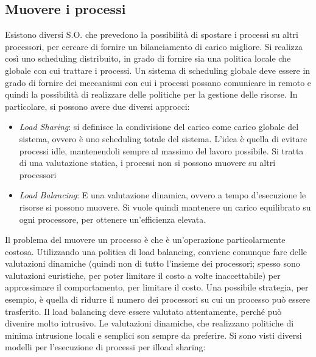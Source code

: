 \subsection{Muovere i processi}
Esistono diversi S.O. che prevedono la possibilità di spostare i processi su altri processori, per cercare di fornire un
bilanciamento di carico migliore. Si realizza così uno scheduling distribuito, in grado di fornire sia una politica
locale che globale con cui trattare i processi. Un sistema di scheduling globale deve essere in grado di fornire dei
meccanismi con cui i processi possano comunicare in remoto e quindi la possibilità di realizzare delle politiche per la
gestione delle risorse.
In particolare, si possono avere due diversi approcci:
\begin{itemize}
 \item \textit{Load Sharing}: si definisce la condivisione del carico come carico globale del sistema, ovvero è uno
 scheduling totale del sistema. L'idea è quella di evitare processi idle, mantenendoli sempre al massimo del lavoro
 possibile. Si tratta di una valutazione statica, i processi non si possono muovere su altri processori
 \item \textit{Load Balancing}: E una valutazione dinamica, ovvero a tempo d'esecuzione le risorse si possono muovere.
 Si vuole quindi mantenere un carico equilibrato su ogni processore, per ottenere un'efficienza elevata.
\end{itemize}
Il problema del muovere un processo è che è un'operazione particolarmente costosa. Utilizzando una politica di load
balancing, conviene comunque fare delle valutazioni dinamiche (quindi non di tutto l'insieme dei processori; spesso sono
valutazioni euristiche, per poter limitare il costo a volte inaccettabile) per approssimare il comportamento, per
limitare il costo. Una possibile strategia, per esempio, è quella di ridurre il numero dei processori su cui un processo
può essere trasferito. Il load balancing deve essere valutato attentamente, perché può divenire molto intrusivo. Le
valutazioni dinamiche, che realizzano politiche di minima intrusione locali e semplici son sempre da preferire.
Si sono visti diversi modelli per l'esecuzione di processi per ilload sharing:

